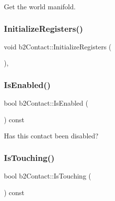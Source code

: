 Get the world manifold. 

\mbox{\label{classb2_contact_ac77031d85c2e06d5cdc1f5c774f8f3fd}} 
\subsubsection{\texorpdfstring{InitializeRegisters()}{InitializeRegisters()}}
{\footnotesize\ttfamily void b2\+Contact\+::\+Initialize\+Registers (\begin{DoxyParamCaption}{ }\end{DoxyParamCaption})\hspace{0.3cm}{\ttfamily [static]}, {\ttfamily [protected]}}

\mbox{\label{classb2_contact_af81964f40dce556efbc83ae760f166b0}} 
\subsubsection{\texorpdfstring{IsEnabled()}{IsEnabled()}}
{\footnotesize\ttfamily bool b2\+Contact\+::\+Is\+Enabled (\begin{DoxyParamCaption}{ }\end{DoxyParamCaption}) const\hspace{0.3cm}{\ttfamily [inline]}}



Has this contact been disabled? 

\mbox{\label{classb2_contact_a681346f93e2a27403383775a752c06a0}} 
\subsubsection{\texorpdfstring{IsTouching()}{IsTouching()}}
{\footnotesize\ttfamily bool b2\+Contact\+::\+Is\+Touching (\begin{DoxyParamCaption}{ }\end{DoxyParamCaption}) const\hspace{0.3cm}{\ttfamily [inline]}}




